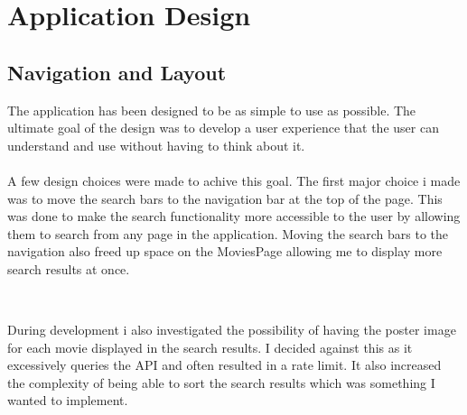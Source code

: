 \documentclass[12pt,a4paper]{article}
\begin{document}
	\newpage

	\section{Application Design}
		\subsection{Navigation and Layout}
			The application has been designed to be as simple to use as possible. The ultimate goal of the 
			design was to develop a user experience that the user can understand and use without having to 
			think about it.\\
			\\
			A few design choices were made to achive this goal. The first major choice i made was to move the 
			search bars to the navigation bar at the top of the page. This was done to make the search 
			functionality more accessible to the user by allowing them to search from any page in the 
			application. Moving the search bars to the navigation also freed up space on the MoviesPage 
			allowing me to display more search results at once.

			\begin{center}
				\\
			\end{center}
			\vspace{10pt}
			During development i also investigated the possibility of having the poster image for each movie 
			displayed in the search results. I decided against this as it excessively queries the API and 
			often resulted in a rate limit. It also increased the complexity of being able to sort the search 
			results which was something I wanted to implement.\\
\end{document}
